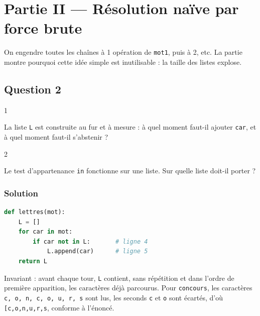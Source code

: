 \documentclass[11pt,a4paper]{article}
\begin{document}
\hypertarget{partie-ii-ruxe9solution-nauxefve-par-force-brute}{%
\section{Partie II --- Résolution naïve par force brute}\label{partie-ii-ruxe9solution-nauxefve-par-force-brute}}

On engendre toutes les chaînes à 1 opération de \texttt{mot1}, puis à 2, etc. La partie montre pourquoi cette idée simple est inutilisable : la taille des listes explose.

\hypertarget{question-2}{%
\subsection{Question 2}\label{question-2}}

\begin{indication}{1}

La liste \texttt{L} est construite au fur et à mesure : à quel moment faut-il ajouter \texttt{car}, et à quel moment faut-il s'abstenir ?

\end{indication}

\begin{indication}{2}

Le test d'appartenance \texttt{in} fonctionne sur une liste. Sur quelle liste doit-il porter ?

\end{indication}

\hypertarget{solution-2}{%
\subsubsection{Solution}\label{solution-2}}

\begin{lstlisting}[language=Python]
def lettres(mot):
    L = []
    for car in mot:
        if car not in L:       # ligne 4
            L.append(car)      # ligne 5
    return L
\end{lstlisting}

Invariant : avant chaque tour, \texttt{L} contient, sans répétition et dans l'ordre de première apparition, les caractères déjà parcourus. Pour \texttt{\textquotesingle{}concours\textquotesingle{}}, les caractères \texttt{c,\allowbreak{}\ o,\allowbreak{}\ n,\allowbreak{}\ c,\allowbreak{}\ o,\allowbreak{}\ u,\allowbreak{}\ r,\allowbreak{}\ s} sont lus, les seconds \texttt{c} et \texttt{o} sont écartés, d'où \texttt{{[}\textquotesingle{}c\textquotesingle{},\allowbreak{}\textquotesingle{}o\textquotesingle{},\allowbreak{}\textquotesingle{}n\textquotesingle{},\allowbreak{}\textquotesingle{}u\textquotesingle{},\allowbreak{}\textquotesingle{}r\textquotesingle{},\allowbreak{}\textquotesingle{}s\textquotesingle{}{]}\allowbreak{}}, conforme à l'énoncé.
\end{document}
